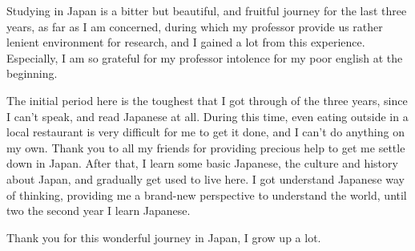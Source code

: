 Studying in Japan is a bitter but beautiful, and fruitful journey for the last
three years, as far as I am concerned, during which my professor provide us
rather lenient environment for research, and I gained a lot from this
experience. Especially, I am so grateful for my professor intolence for my poor
english at the beginning.

The initial period here is the toughest that I got through of the three years,
since I can't speak, and read Japanese at all. During this time, even eating
outside in a local restaurant is very difficult for me to get it done, and I
can't do anything on my own. Thank you to all my friends for providing precious
help to get me settle down in Japan. After that, I learn some basic Japanese,
the culture and history about Japan, and gradually get used to live here.  I got
understand Japanese way of thinking, providing me a brand-new perspective to
understand the world, until two the second year I learn Japanese.  

Thank you for this wonderful journey in Japan, I grow up a lot.





